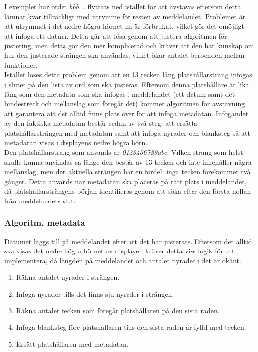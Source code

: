 \documentclass[a4paper,11pt]{article}
\begin{document}
I exemplet har ordet {\it bbb...} flyttats ned istället för att avstavas eftersom detta lämnar kvar tillräckligt med utrymme för resten av meddelandet. Problemet är att utrymmet i det nedre högra hörnet nu är förbrukat, vilket gör det omöjligt att infoga ett datum. Detta går att lösa genom att justera algoritmen för justering, men detta gör den mer komplicerad och kräver att den har kunskap om hur den justerade strängen ska användas, vilket ökar antalet beroenden mellan funktioner. \\

Istället löses detta problem genom att en 13 tecken lång platshållarsträng infogas i slutet på den lista av ord som ska justeras. Eftersom denna platshållare är lika lång som den metadata som ska infogas i meddelandet (ett datum samt det bindestreck och mellanslag som föregår det) kommer algoritmen för avstavning att garantera att det alltid finns plats över för att infoga metadatan. Infogandet av den faktiska metadatan består sedan av två steg: att ersätta platshållarsträngen med metadatan samt att infoga nyrader och blanksteg så att metadatan visas i displayens nedre högra hörn. \\

Den platshållarsträng som används är {\it 0123456789abc}. Vilken sträng som helst skulle kunna användas så länge den består av 13 tecken och inte innehåller några mellanslag, men den aktuella strängen har en fördel: inga tecken förekommer två gånger. Detta används när metadatan ska placeras på rätt plats i meddelandet, då platshållarsträngens början identifieras genom att söka efter den första nollan från meddelandets slut. 

\subsubsection{Algoritm, metadata}
Datumet läggs till på meddelandet efter att det har justerats. Eftersom det alltid ska visas det nedre högra hörnet av displayen kräver detta viss logik för att implementera, då längden på meddelandet och antalet nyrader i det är okänt.
	\begin{enumerate}
    	\item Räkna antalet nyrader i strängen.
    	\item Infoga nyrader tills det finns sju nyrader i strängen.
    	\item Räkna antalet tecken som föregår platshållaren på den sista raden.
    	\item Infoga blanksteg före platshållaren tills den sista raden är fylld med tecken.
    	\item Ersätt platshållaren med metadatan.
    	\end{enumerate}
    	
\end{document}
